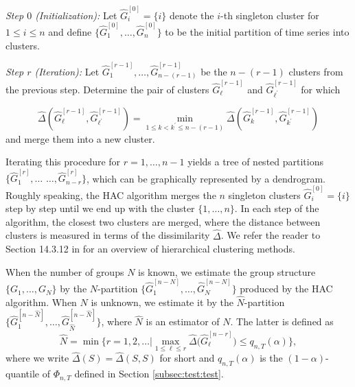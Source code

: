 \documentclass[a4paper,12pt]{article}
\begin{document}
\noindent \textit{Step $0$ (Initialization):} Let $\widehat{G}_i^{[0]} = \{ i \}$ denote the $i$-th singleton cluster for $1 \le i \le n$ and define $\{\widehat{G}_1^{[0]},\ldots,\widehat{G}_n^{[0]} \}$ to be the initial partition of time series into clusters. 
\vspace{5pt}

\noindent \textit{Step $r$ (Iteration):} Let $\widehat{G}_1^{[r-1]},\ldots,\widehat{G}_{n-(r-1)}^{[r-1]}$ be the $n-(r-1)$ clusters from the previous step. Determine the pair of clusters $\widehat{G}_{\ell}^{[r-1]}$ and $\widehat{G}_{{\ell}^\prime}^{[r-1]}$ for which 

\[ \widehat{\Delta}(\widehat{G}_{\ell}^{[r-1]},\widehat{G}_{{\ell}^\prime}^{[r-1]}) = \min_{1 \le k < k^\prime \le n-(r-1)} \widehat{\Delta}(\widehat{G}_{k}^{[r-1]},\widehat{G}_{k^\prime}^{[r-1]}) \]  
and merge them into a new cluster. 
\vspace{10pt}

\noindent Iterating this procedure for $r = 1,\ldots,n-1$ yields a tree of nested partitions \linebreak $\{\widehat{G}_1^{[r]},\ldots$ $\ldots,\widehat{G}_{n-r}^{[r]}\}$, which can be graphically represented by a dendrogram. Roughly speaking, the HAC algorithm merges the $n$ singleton clusters $\widehat{G}_i^{[0]} = \{ i \}$ step by step until we end up with the cluster $\{1,\ldots,n\}$. In each step of the algorithm, the closest two clusters are merged, where the distance between clusters is measured in terms of the dissimilarity $\widehat{\Delta}$. We refer the reader to Section 14.3.12 in \cite{HastieTibshiraniFriedman2009} for an overview of hierarchical clustering methods. 


When the number of groups $N$ is known, we estimate the group structure $\{G_1,\ldots, G_N\}$ by the $N$-partition $\{\widehat{G}_1^{[n-N]},\ldots,\widehat{G}_{N}^{[n-N]}\}$ produced by the HAC algorithm. When $N$ is unknown, we estimate it by the $\widehat{N}$-partition $\{\widehat{G}_1^{[n-\widehat{N}]},\ldots,\widehat{G}_{\widehat{N}}^{[n-\widehat{N}]}\}$, where $\widehat{N}$ is an estimator of $N$. The latter is defined as 
\[ \widehat{N} = \min \Big\{ r = 1,2,\ldots \Big| \max_{1 \le \ell \le r} \widehat{\Delta} \big( \widehat{G}_\ell^{[n-r]} \big) \le q_{n,T}(\alpha) \Big\}, \]
where we write $\widehat{\Delta}(S) = \widehat{\Delta}(S,S)$ for short and $q_{n,T}(\alpha)$ is the $(1-\alpha)$-quantile of $\Phi_{n,T}$ defined in Section \ref{subsec:test:test}. 
\end{document}
